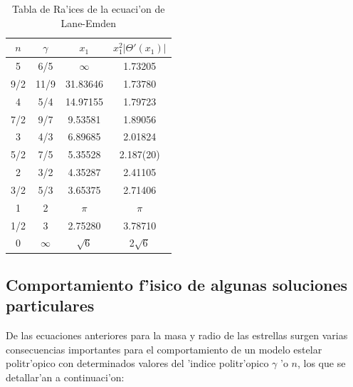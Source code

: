 \begin{table}[H]
\begin{center}
\caption{Tabla de Ra'ices de la ecuaci'on de Lane-Emden}\label{tablalaneemden}
\vspace{2mm}
\begin{tabular}{|c|c|c|c|}\hline
$n$&$\gamma$ &$x_1$&$x_1^2\left|\Theta'(x_1)\right|$\\ \hline
5&6/5&$\infty$&1.73205\\
9/2&11/9&31.83646&1.73780\\
4&5/4&14.97155&1.79723\\
7/2&9/7&9.53581&1.89056\\
3&4/3&6.89685&2.01824\\
5/2&7/5&5.35528&2.187(20)\\
2&3/2&4.35287&2.41105\\
3/2&5/3&3.65375&2.71406\\
1&2&$\pi$&$\pi$\\
1/2&3&2.75280&3.78710\\
0&$\infty$&$\sqrt{6}$&2$\sqrt{6}$\\ \hline
\end{tabular}
\end{center}
\end{table}


\subsection{Comportamiento f'isico de algunas soluciones particulares}\label{sec:casos-lane-emden}

De las ecuaciones anteriores para la masa y radio de las estrellas surgen varias consecuencias importantes para el comportamiento de un modelo estelar politr'opico con determinados valores del 'indice politr'opico $\gamma$ 'o $n$, los que se detallar'an a continuaci'on:

